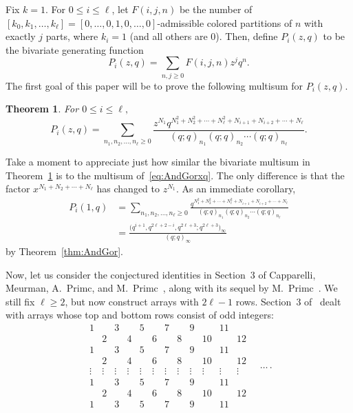 \documentclass[pdftex]{sigma}
\numberwithin{equation}{section}
\newtheorem{Theorem}{Theorem}[section]
\theoremstyle{definition}
\begin{document}
Fix $k=1$. For $0 \le i \le \ell$, let $F(i,j,n)$ be the number of $\left[k_0,k_1,\dots,k_\ell\right]=\left[0,\dots,0,1,0,\dots,0\right]$-admissible colored partitions of $n$ with exactly $j$ parts, where $k_i=1$ (and all others are 0). Then, define $P_{i}(z,q)$ to be the bivariate generating function
\begin{equation*}
P_{i}(z,q)=\sum_{n,j\ge 0} F(i,j,n)z^j q^n.
\end{equation*}
The first goal of this paper will be to prove the following multisum for $P_i(z,q)$.
\begin{Theorem} \label{thm:mainresult1}
For $0\le i \le \ell,$
\begin{equation} \label{eq:mainresult1}
P_i(z,q)=\sum_{n_1,n_2,\dots,n_{\ell}\ge 0} \frac{z^{N_1}q^{N_1^2+N_2^2+\cdots+N_{\ell}^2+N_{i+1}+N_{i+2}+\cdots+N_{\ell}}}{(q;q)_{n_1}(q;q)_{n_2}\cdots(q;q)_{n_{\ell}}}.
\end{equation}
\end{Theorem}

Take a moment to appreciate just how similar the bivariate multisum in Theorem~\ref{thm:mainresult1} is to the multisum of~\eqref{eq:AndGorxq}. The only difference is that the factor $x^{N_1+N_2+\cdots+N_{\ell}}$ has changed to $z^{N_1}$. As an immediate corollary,
\begin{align}
P_i(1,q)& =\sum_{n_1,n_2,\dots,n_{\ell}\ge 0} \frac{q^{N_1^2+N_2^2+\cdots+N_{\ell}^2+N_{i+1}+N_{i+2}+\cdots+N_{\ell}}}{(q;q)_{n_1}(q;q)_{n_2}\cdots(q;q)_{n_{\ell}}}\nonumber\\
& = \frac{\bigl(q^{i+1},q^{2\ell+2-i},q^{2\ell+3};q^{2\ell+3}\bigr)_\infty}{(q;q)_\infty}\label{eq:sumprod1}
\end{align}
by Theorem~\ref{thm:AndGor}.

Now, let us consider the conjectured identities in Section~3 of Capparelli, Meurman, A.~Primc, and M.~Primc~\cite{CMPP}, along with its sequel by M.~Primc~\cite{primc2023}. We still fix $\ell\ge 2$, but now construct arrays with $2\ell-1$ rows. Section~3 of~\cite{CMPP} dealt with arrays whose top and bottom rows consist of odd integers:
\begin{equation*}
\begin{matrix}
1 && 3 && 5 && 7 && 9 && 11 & \\
& 2 && 4 && 6 && 8 && 10 && 12\\
1 && 3 && 5 && 7 && 9 && 11 & \\
& 2 && 4 && 6 && 8 && 10 && 12\\
\vdots & \vdots &\vdots& \vdots &\vdots& \vdots &\vdots& \vdots &\vdots& \vdots &\vdots& \vdots\\
1 && 3 && 5 && 7 && 9 && 11 & \\
& 2 && 4 && 6 && 8 && 10 && 12 \\
1 && 3 && 5 && 7 && 9 && 11 &
 \end{matrix}\quad\dots\,.
\end{equation*}
\end{document}
